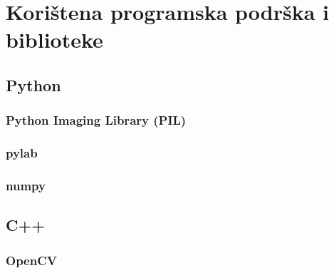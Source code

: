 \chapter{Korištena programska podrška i biblioteke}
\section{Python}
\subsection{Python Imaging Library (PIL)}
\subsection{pylab}
\subsection{numpy}

\section{C++}
\subsection{OpenCV}